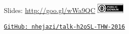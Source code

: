 \documentclass[12pt,t,handout]{beamer}
\begin{document}
\begin{frame}[c]{}

\Large

Slides: \url{http://goo.gl/wWa9QC} \quad
\includegraphics[height=5mm]{Figs/cc-zero.png}

\vspace{10mm}

\href{https://github.com/nhejazi/talk-h2oSL-THW-2016}
{\tt GitHub: nhejazi/talk-h2oSL-THW-2016}

\end{frame}
\end{document}
